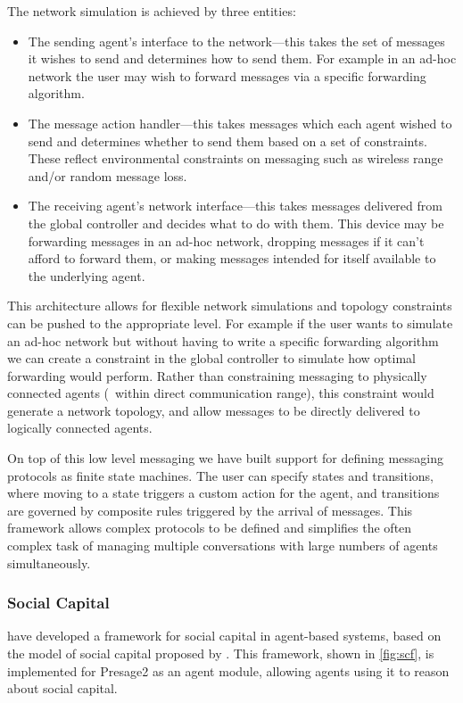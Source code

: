 The network simulation is achieved by three entities:
\begin{itemize}
	\item The sending agent's interface to the network---this takes the set
	of messages it wishes to send and determines how to send them. For
	example in an ad-hoc network the user may wish to forward messages
	via a specific forwarding algorithm. 
	\item The message action handler---this takes messages which each agent
	wished to send and determines whether to send them based on a set
	of constraints. These reflect environmental constraints on messaging
	such as wireless range and/or random message loss.
	\item The receiving agent's network interface---this takes messages delivered
	from the global controller and decides what to do with them. This
	device may be forwarding messages in an ad-hoc network, dropping messages
	if it can't afford to forward them, or making messages intended for
	itself available to the underlying agent.
\end{itemize}

This architecture allows for flexible network simulations and topology
constraints can be pushed to the appropriate level. For example if the user
wants to simulate an ad-hoc network but without having to write a specific
forwarding algorithm we can create a constraint in the global controller to
simulate how optimal forwarding would perform. Rather than constraining
messaging to physically connected agents (\ie\ within direct communication
range), this constraint would generate a network topology, and allow messages
to be directly delivered to logically connected agents.

On top of this low level messaging we have built support for defining
messaging protocols as finite state machines. The user can specify
states and transitions, where moving to a state triggers a custom
action for the agent, and transitions are governed by composite rules
triggered by the arrival of messages. This framework allows complex
protocols to be defined and simplifies the often complex task of
managing multiple conversations with large numbers of agents simultaneously.

\subsubsection*{Social Capital}

\citet{Petruzzi2014} have developed a framework for social capital in 
agent-based systems, based on the model of social capital proposed by
\citet{ostromahn2003}. This framework, shown in \autoref{fig:scf}, is
implemented for Presage2 as an agent module, allowing agents using it to
reason about social capital.

